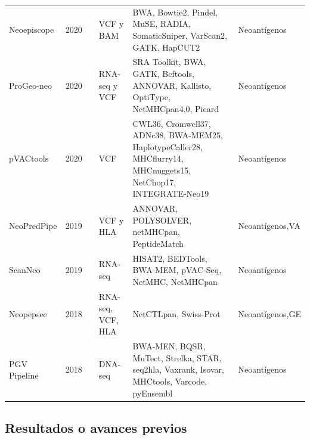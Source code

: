\documentclass[a4paper,11pt]{article}
\begin{document}
\begin{table}[h]
{{\begin{tabular}{lllp{2cm}p{8.5cm}p{2cm}}
	Neoepiscope     & 2020 &\cite{wood2020neoepiscope}        & VCF y BAM            & BWA, Bowtie2, Pindel, MuSE, RADIA, SomaticSniper, VarScan2, GATK, HapCUT2       & Neoantígenos                          \\
	
	ProGeo-neo      & 2020 &\cite{li2020progeo}               & RNA-seq y VCF           & SRA Toolkit, BWA, GATK, Bcftools, ANNOVAR, Kallisto, OptiType, NetMHCpan4.0, Picard             & Neoantígenos                                       \\
	
	pVACtools       & 2020 &\cite{hundal2020pvactools}        & VCF                                         & CWL36, Cromwell37, ADNc38, BWA-MEM25, HaplotypeCaller28, MHCflurry14, MHCnuggets15, NetChop17, INTEGRATE-Neo19 & Neoantígenos                                       \\
	
	NeoPredPipe     & 2019 &\cite{schenck2019neopredpipe}     & VCF y HLA                & ANNOVAR, POLYSOLVER, netMHCpan, PeptideMatch            & Neoantígenos,VA              \\
	
	ScanNeo         & 2019 &\cite{wang2019scanneo}            & RNA-seq                                                  & HISAT2, BEDTools, BWA-MEM, pVAC-Seq, NetMHC, NetMHCpan & Neoantígenos                                       \\
	
		
	Neopepsee       & 2018 &\cite{kim2018neopepsee}           & RNA-seq, VCF, HLA  & NetCTLpan, Swiss-Prot & Neoantígenos,GE    \\ 
	
	PGV Pipeline    & 2018 &\cite{rubinsteyn2018computational}& DNA-seq                                                  & BWA-MEN, BQSR, MuTect, Strelka, STAR, seq2hla, Vaxrank, Isovar, MHCtools, Varcode, pyEnsembl & Neoantígenos                                       \\
	

\end{tabular}
}	
}
\end{table}




\subsection{Resultados o avances previos}
\end{document}
